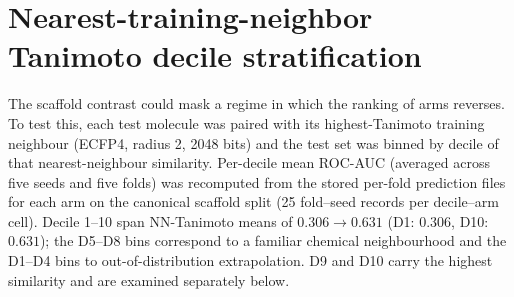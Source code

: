 \documentclass[11pt,a4paper]{article}
\begin{document}
\section{Nearest-training-neighbor Tanimoto decile stratification}
\label{sec:nn_deciles_si}

The scaffold contrast could mask a regime in which the ranking of arms reverses. To test this, each test molecule was paired with its highest-Tanimoto training neighbour (ECFP4, radius \num{2}, \num{2048} bits) and the test set was binned by decile of that nearest-neighbour similarity. Per-decile mean ROC-AUC (averaged across five seeds and five folds) was recomputed from the stored per-fold prediction files for each arm on the canonical scaffold split (\num{25} fold--seed records per decile--arm cell). Decile \numrange{1}{10} span NN-Tanimoto means of $\num{0.306} \to \num{0.631}$ (D\num{1}: $\num{0.306}$, D\num{10}: $\num{0.631}$); the D\num{5}--D\num{8} bins correspond to a familiar chemical neighbourhood and the D\num{1}--D\num{4} bins to out-of-distribution extrapolation. D\num{9} and D\num{10} carry the highest similarity and are examined separately below.
\end{document}
